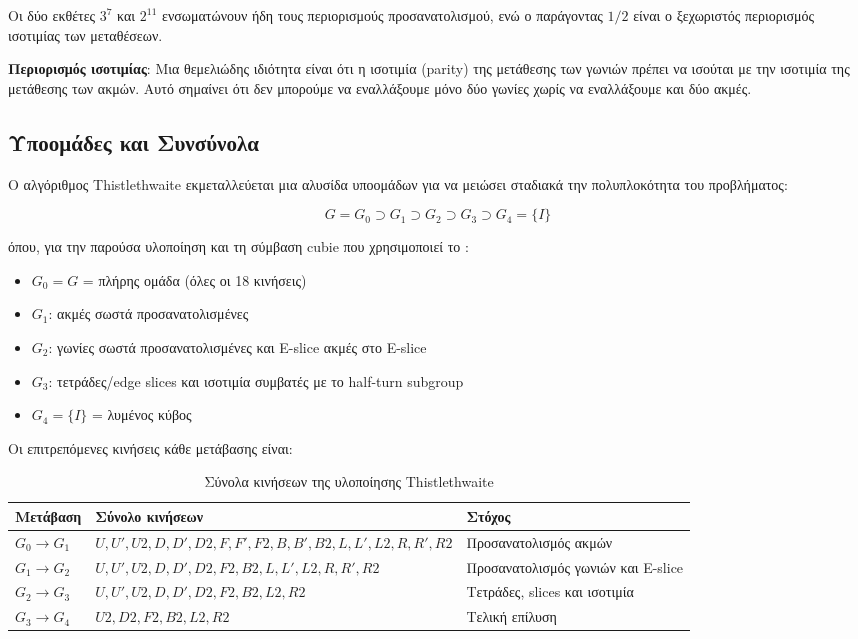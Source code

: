 Οι δύο εκθέτες $3^7$ και $2^{11}$ ενσωματώνουν ήδη τους περιορισμούς
προσανατολισμού, ενώ ο παράγοντας $1/2$ είναι ο ξεχωριστός περιορισμός
ισοτιμίας των μεταθέσεων.

\textbf{Περιορισμός ισοτιμίας}: Μια θεμελιώδης ιδιότητα είναι ότι η ισοτιμία (parity) της μετάθεσης των γωνιών πρέπει να ισούται με την ισοτιμία της μετάθεσης των ακμών. Αυτό σημαίνει ότι δεν μπορούμε να εναλλάξουμε μόνο δύο γωνίες χωρίς να εναλλάξουμε και δύο ακμές.

\subsection{Υποομάδες και Συνσύνολα}
\label{subsec:subgroups_cosets}

Ο αλγόριθμος Thistlethwaite \cite{scherphuis_thistlethwaite_summary} εκμεταλλεύεται μια αλυσίδα υποομάδων για να μειώσει σταδιακά την πολυπλοκότητα του προβλήματος:

\begin{equation}
    G = G_0 \supset G_1 \supset G_2 \supset G_3 \supset G_4 = \{I\}
\end{equation}

όπου, για την παρούσα υλοποίηση και τη σύμβαση cubie που χρησιμοποιεί
το :
\begin{itemize}
    \item $G_0 = G$ = πλήρης ομάδα (όλες οι 18 κινήσεις)
    \item $G_1$: ακμές σωστά προσανατολισμένες
    \item $G_2$: γωνίες σωστά προσανατολισμένες και E-slice ακμές στο E-slice
    \item $G_3$: τετράδες/edge slices και ισοτιμία συμβατές με το half-turn subgroup
    \item $G_4 = \{I\}$ = λυμένος κύβος
\end{itemize}

Οι επιτρεπόμενες κινήσεις κάθε μετάβασης είναι:

\begin{table}[h]
\centering
\scriptsize
\caption{Σύνολα κινήσεων της υλοποίησης Thistlethwaite}
\label{tab:thistlethwaite_impl_moves_background}
\begin{tabularx}{\textwidth}{l>{\RaggedRight\arraybackslash}X>{\RaggedRight\arraybackslash}p{3.1cm}}
\toprule
\textbf{Μετάβαση} & \textbf{Σύνολο κινήσεων} & \textbf{Στόχος} \\
\midrule
$G_0 \to G_1$ & $U,U',U2,D,D',D2,F,F',F2,B,B',B2,L,L',L2,R,R',R2$ & Προσανατολισμός ακμών \\
$G_1 \to G_2$ & $U,U',U2,D,D',D2,F2,B2,L,L',L2,R,R',R2$ & Προσανατολισμός γωνιών και E-slice \\
$G_2 \to G_3$ & $U,U',U2,D,D',D2,F2,B2,L2,R2$ & Τετράδες, slices και ισοτιμία \\
$G_3 \to G_4$ & $U2,D2,F2,B2,L2,R2$ & Τελική επίλυση \\
\bottomrule
\end{tabularx}
\end{table}

